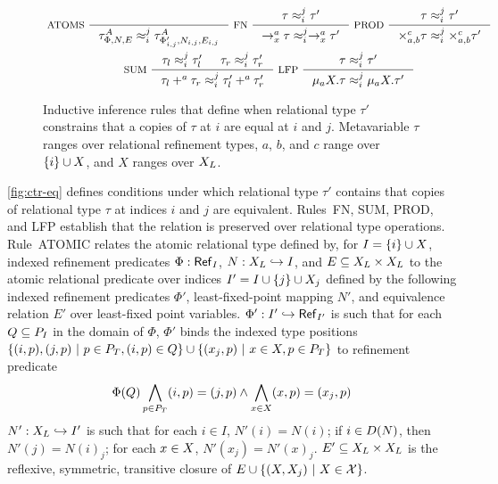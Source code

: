 \begin{figure}
  \centering
  \begin{gather*}
    \inference[ ATOMS ]{ }{ %
      \tau^A_{\Phi, N, E} \copyrel{i}{j} %
      \tau^A_{\Phi'_{i, j}, N_{i, j}, E_{i, j}} } 
    \inference[ FN ]{ 
      \tau \copyrel{i}{j} \tau' }{
      \to_x^a \tau \copyrel{i}{j} \to_x^a \tau' } 
    \inference[ PROD ]{
      \tau \copyrel{i}{j} \tau' }{
      \times_{a, b}^c \tau \copyrel{i}{j} \times_{a, b}^c \tau' } \\
    \inference[ SUM ]{
      \tau_l \copyrel{i}{j} \tau_l' & %
      \tau_r \copyrel{i}{j} \tau_r' }{
      \tau_l +^a \tau_r \copyrel{i}{j} \tau_l' +^a \tau_r' }
    \inference[ LFP ]{
      \tau \copyrel{i}{j} \tau' }{
      \mu_a X. \tau \copyrel{i}{j} \mu_a X. \tau' }
  \end{gather*}
  \caption{Inductive inference rules that define when relational type $\tau'$ constrains that a copies of $\tau$ at $i$ are equal at $i$ and $j$.
    Metavariable $\tau$ ranges over relational refinement types, %
    $a$, $b$, and $c$ range over $\{ i \} \cup X$, and %
    $X$ ranges over $X_L$. }
  \label{fig:ctr-eq}
\end{figure}
%
\autoref{fig:ctr-eq} defines conditions under which relational type
$\tau'$ contains that copies of relational type $\tau$ at indices $i$
and $j$ are equivalent.
%
Rules~FN, SUM, PROD, and LFP establish that the relation is preserved
over relational type operations.
%
Rule~ATOMIC relates the atomic relational type defined by, for
$I = \{ i \} \cup X$, indexed refinement predicates
$\Phi : \mathsf{Ref}_{ I }$, %
$N : X_L \hookrightarrow I$, and %
$E \subseteq X_L \times X_L$ to the atomic relational
predicate over indices $I' = I \cup \{  j  \} \cup  X_j $ defined by
the following indexed refinement predicates $\Phi'$, least-fixed-point
mapping $N'$, and equivalence relation $E'$ over least-fixed point
variables.
%
$\Phi' : I' \hookrightarrow \mathsf{Ref}_{ I' }$ is such that for each
$Q \subseteq P_{ I }$ in the domain of $\Phi$, $\Phi'$ binds the
indexed type positions
$\{  (i, p), (j, p) \ |\  p \in P_T, (i, p) \in Q  \} \cup
\{  (x_j, p) \ |\  x \in X, p \in P_T  \}$ to refinement predicate
\[ \Phi(Q) \bigland_{p \in \typos} (i, p) = (j, p) \land %
  \bigland_{ x \in \vars } (x, p) = (x_j, p) \]
$N' : X_L \hookrightarrow I'$ is such that %
for each $i \in I$, $N'(i) = N(i)$; %
if $i \in D(N)$, then $N'(j) = N(i)_j$;
for each $x \in X$, $N'(x_j) = N'(x)_j$.
$E' \subseteq X_L \times X_L$ is the reflexive, symmetric,
transitive closure of
$E \cup \{  (X, X_j) \ |\  X \in \mathcal{ X }  \}$.

